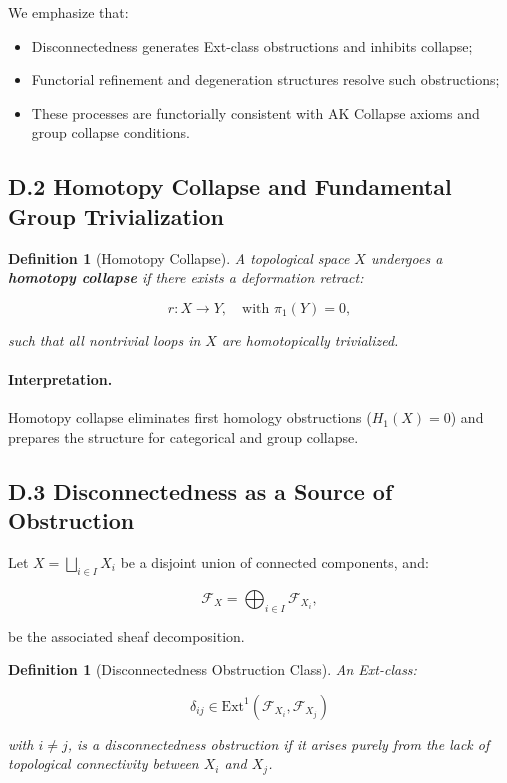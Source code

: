 \documentclass[11pt]{article}
\newtheorem{definition}[theorem]{Definition}
\begin{document}
We emphasize that:

\begin{itemize}
    \item Disconnectedness generates Ext-class obstructions and inhibits collapse;
    \item Functorial refinement and degeneration structures resolve such obstructions;
    \item These processes are functorially consistent with AK Collapse axioms and group collapse conditions.
\end{itemize}

\subsection*{D.2 Homotopy Collapse and Fundamental Group Trivialization}

\begin{definition}[Homotopy Collapse]
A topological space \( X \) undergoes a \textbf{homotopy collapse} if there exists a deformation retract:

\[
r: X \to Y, \quad \text{with } \pi_1(Y) = 0,
\]

such that all nontrivial loops in \( X \) are homotopically trivialized.
\end{definition}

\paragraph{Interpretation.}
Homotopy collapse eliminates first homology obstructions (\( H_1(X) = 0 \)) and prepares the structure for categorical and group collapse.

\subsection*{D.3 Disconnectedness as a Source of Obstruction}

Let \( X = \bigsqcup_{i \in I} X_i \) be a disjoint union of connected components, and:

\[
\mathcal{F}_X = \bigoplus_{i \in I} \mathcal{F}_{X_i},
\]

be the associated sheaf decomposition.

\begin{definition}[Disconnectedness Obstruction Class]
An Ext-class:

\[
\delta_{ij} \in \mathrm{Ext}^1(\mathcal{F}_{X_i}, \mathcal{F}_{X_j})
\]

with \( i \neq j \), is a \emph{disconnectedness obstruction} if it arises purely from the lack of topological connectivity between \( X_i \) and \( X_j \).
\end{definition}
\end{document}
